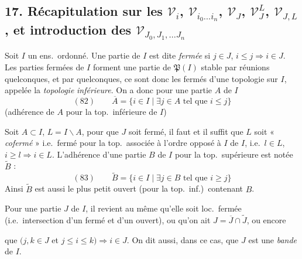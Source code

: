 \documentclass[11pt,a4paper]{article}
\begin{document}

\subsection*{17. Récapitulation sur les $\mathcal V_i$, $\mathcal V_{i_0\ldots i_n}$, $\mathcal V_J$, $\mathcal V_J^L$, $\mathcal V_{J,L}$, et introduction des $\mathcal V_{J_0,J_1,\ldots J_n}$}

Soit $I$ un ens.\ ordonné. Une partie  de $I$ est dite \emph{fermée} si $j\in J$, $i\le j\Rightarrow i\in J$. Les parties fermées de $I$ forment une  partie de $\mathfrak P(I)$ stable par  réunions  quelconques, et par   quelconques, ce sont donc les fermés d'une topologie sur $I$, appelée la \emph{topologie} \struck{\ill{} \ill{}} \emph{inférieure}.  On a donc pour une partie $A$ de $I$
\[
(82)\qquad \overline A=\lbrace i\in I\mid \exists j\in A \text{ tel que } i\le j\rbrace
\]
(adhérence de $A$ pour la top.\ inférieure de $I$)

 Soit $A\subset I$, $L=I\smallsetminus A$, pour que $J$ soit fermé,  il faut et il suffit que $L$ soit « \emph{cofermé} » i.e.\ fermé pour la top.\ associée à l'ordre opposé à $I$  de $I$, i.e.\ $l\in L$,  $i\ge l\Rightarrow i\in L$. L'adhérence d'une partie $B$ de $I$ pour la top.\ supérieure est notée $\widetilde B$ :
\[
(83)\qquad \widetilde B=\lbrace i\in I\mid \exists j\in B \text{ tel que } i\ge j\rbrace
\]
 Ainsi $\widetilde B$ est aussi le plus petit ouvert (pour la top.\ inf.)\ contenant $B$.

 Pour une partie $J$ de $I$, il revient au même qu'elle soit loc.\ fermée (i.e.\ intersection d'un fermé et d'un ouvert), ou qu'on ait $J=\overline J\cap\widetilde J$, ou encore


que \struck{\ill{}} $(j,k\in J$ et $j\le i\le k)\Rightarrow i\in J$. On dit  aussi, dans ce cas, que $J$ est une \emph{bande} de $I$.
\end{document}
